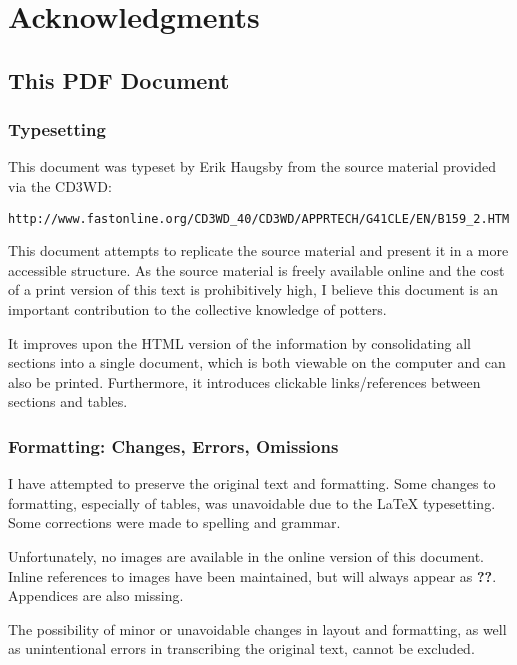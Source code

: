 \chapter*{Acknowledgments}
\section*{This PDF Document}
\subsection*{Typesetting}
This document was typeset by Erik Haugsby from the source material provided 
via the CD3WD:
\begin{verbatim}
http://www.fastonline.org/CD3WD_40/CD3WD/APPRTECH/G41CLE/EN/B159_2.HTM
\end{verbatim}
This document attempts to replicate the source material and present it in a 
more accessible structure. As the source material is freely available online 
and the cost of a print version of this text is prohibitively high, I believe 
this document is an important contribution to the collective knowledge of 
potters. 

It improves upon the HTML version of the information by consolidating all 
sections into a single document, which is both viewable on the computer and can 
also be printed. Furthermore, it introduces clickable links/references between 
sections and tables.
\subsection*{Formatting: Changes, Errors, Omissions}
I have attempted to preserve the original text and formatting. Some changes to 
formatting, especially of tables, was unavoidable due to the LaTeX typesetting. 
Some corrections were made to spelling and grammar.

Unfortunately, no images are available in the online version of this document. 
Inline references to images have been maintained, but will always appear as 
\textbf{??}. Appendices are also missing.

The possibility of minor or unavoidable changes in layout and formatting, as 
well as unintentional errors in transcribing the original text, cannot be 
excluded.

